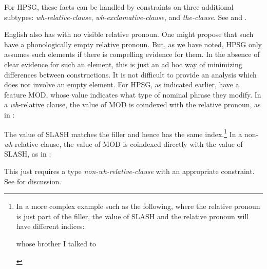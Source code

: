 \documentclass[output=paper]{langsci/langscibook}
\begin{document}
\ea\label{ex:key:4.12}
    \z
\z
%
For \gls{HPSG}, these facts can be handled by constraints on three additional
subtypes: \emph{wh-relative-clause}, \emph{wh-exclamative-clause}, and
\emph{the-clause}. See \citet{GinSag2000} and \citet{Sag2010}.

English also has  with no visible relative pronoun. One might
propose that such  have a phonologically empty relative
pronoun. But, as we have noted, \gls{HPSG} only assumes such elements if there
is compelling evidence for them. In the absence of clear evidence for such an
element, this is just an ad hoc way of minimizing differences between
constructions. It is not difficult to provide an analysis which does not involve
an empty element. For \gls{HPSG}, as
indicated earlier,  have a feature MOD, whose value
indicates what type of nominal phrase they modify. In a \emph{wh}-relative
clause, the value of MOD is coindexed with the relative pronoun, as in
:

\ea\label{ex:key:4.13}
\z
%
The value of SLASH matches the filler and hence has the same index.\footnote{In
    a more complex example such as the following, where the relative pronoun is
    just part of the filler, the value of SLASH and the relative pronoun will
    have different indices:

\begin{exe}
     whose brother I talked to
\end{exe}} In a non-\emph{wh}-relative clause, the value of MOD is coindexed
directly with the value of SLASH, as in :

\ea\label{ex:key:4.14}
\z
%
This just requires a type \emph{non-wh-relative-clause} with an appropriate
constraint. See \citet{Sag1997} for discussion.
\end{document}
